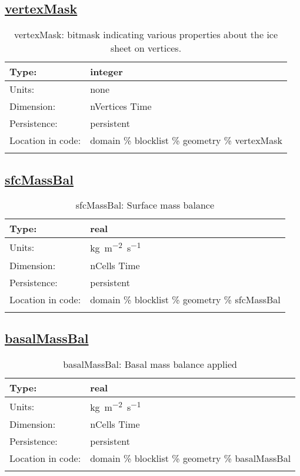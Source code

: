 \subsection[vertexMask]{\hyperref[sec:var_tab_geometry]{vertexMask}}
\label{subsec:var_sec_geometry_vertexMask}
\begin{center}
\begin{longtable}{| p{2.0in} | p{4.0in} |}
        \hline 
        Type: & integer \\
        \hline 
        Units: & \si{none} \\
        \hline 
        Dimension: & nVertices Time \\
        \hline 
        Persistence: & persistent \\
        \hline 
         Location in code: & domain \% blocklist \% geometry \% vertexMask \\
         \hline 
    \caption{vertexMask: bitmask indicating various properties about the ice sheet on vertices.}
\end{longtable}
\end{center}
\subsection[sfcMassBal]{\hyperref[sec:var_tab_geometry]{sfcMassBal}}
\label{subsec:var_sec_geometry_sfcMassBal}
\begin{center}
\begin{longtable}{| p{2.0in} | p{4.0in} |}
        \hline 
        Type: & real \\
        \hline 
        Units: & \si{kg.m^{-2}.s^{-1}} \\
        \hline 
        Dimension: & nCells Time \\
        \hline 
        Persistence: & persistent \\
        \hline 
         Location in code: & domain \% blocklist \% geometry \% sfcMassBal \\
         \hline 
    \caption{sfcMassBal: Surface mass balance}
\end{longtable}
\end{center}
\subsection[basalMassBal]{\hyperref[sec:var_tab_geometry]{basalMassBal}}
\label{subsec:var_sec_geometry_basalMassBal}
\begin{center}
\begin{longtable}{| p{2.0in} | p{4.0in} |}
        \hline 
        Type: & real \\
        \hline 
        Units: & \si{kg.m^{-2}.s^{-1}} \\
        \hline 
        Dimension: & nCells Time \\
        \hline 
        Persistence: & persistent \\
        \hline 
         Location in code: & domain \% blocklist \% geometry \% basalMassBal \\
         \hline 
    \caption{basalMassBal: Basal mass balance applied}
\end{longtable}
\end{center}
